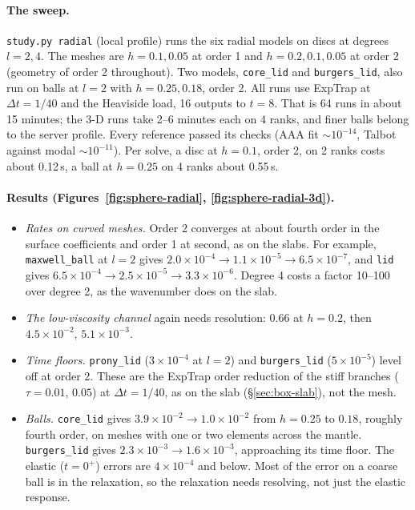 \documentclass[11pt]{article}
\numberwithin{equation}{section}
\newcommand{\code}[1]{\texttt{#1}}
\begin{document}
\paragraph{The sweep.}
\code{study.py radial} (local profile) runs the six radial models on
discs at degrees $l=2,4$. The meshes are $h=0.1,0.05$ at order 1 and
$h=0.2,0.1,0.05$ at order 2 (geometry of order 2 throughout). Two models,
\code{core\_lid} and \code{burgers\_lid}, also run on balls at $l=2$
with $h=0.25,0.18$, order 2. All runs use ExpTrap at $\Delta t=1/40$ and
the Heaviside load, 16 outputs to $t=8$. That is 64 runs in about 15
minutes; the 3-D runs take 2--6 minutes each on 4 ranks, and finer balls
belong to the server profile. Every reference passed its checks (AAA
fit $\sim10^{-14}$, Talbot against modal $\sim10^{-11}$). Per solve, a disc
at $h=0.1$, order 2, on 2 ranks costs about 0.12\,s, a ball at $h=0.25$ on
4 ranks about 0.55\,s.

\paragraph{Results (Figures~\ref{fig:sphere-radial}, \ref{fig:sphere-radial-3d}).}
\begin{itemize}[leftmargin=*]
\item \emph{Rates on curved meshes.} Order 2 converges at about fourth
  order in the surface coefficients and order 1 at second, as on the
  slabs. For example, \code{maxwell\_ball} at $l=2$ gives
  $2.0\times10^{-4}\to1.1\times10^{-5}\to6.5\times10^{-7}$, and \code{lid}
  gives $6.5\times10^{-4}\to2.5\times10^{-5}\to3.3\times10^{-6}$.
  Degree 4 costs a factor 10--100 over degree 2, as the wavenumber does
  on the slab.
\item \emph{The low-viscosity channel} again needs resolution: $0.66$ at
  $h=0.2$, then $4.5\times10^{-2}$, $5.1\times10^{-3}$.
\item \emph{Time floors.} \code{prony\_lid} ($3\times10^{-4}$ at $l=2$)
  and \code{burgers\_lid} ($5\times10^{-5}$) level off at order 2. These
  are the ExpTrap order reduction of the stiff branches ($\tau=0.01$,
  $0.05$) at $\Delta t=1/40$, as on the slab (\S\ref{sec:box-slab}), not
  the mesh.
\item \emph{Balls.} \code{core\_lid} gives $3.9\times10^{-2}\to1.0\times10^{-2}$
  from $h=0.25$ to $0.18$, roughly fourth order, on meshes with one or two
  elements across the mantle. \code{burgers\_lid} gives
  $2.3\times10^{-3}\to1.6\times10^{-3}$, approaching its time floor. The
  elastic ($t=0^+$) errors are $4\times10^{-4}$ and below. Most of the
  error on a coarse ball is in the relaxation, so the relaxation needs
  resolving, not just the elastic response.
\end{itemize}
\end{document}
